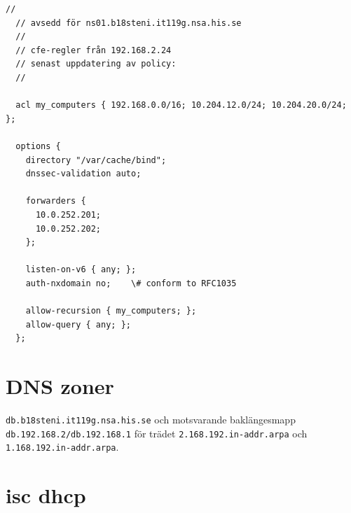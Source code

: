 \documentclass[swedish,10pt,a4paper]{article}
\begin{document}
\begin{lstlisting}[caption={/etc/bind/named.conf.options}]
  //
  // avsedd för ns01.b18steni.it119g.nsa.his.se
  //
  // cfe-regler från 192.168.2.24
  // senast uppdatering av policy:
  //

  acl my_computers { 192.168.0.0/16; 10.204.12.0/24; 10.204.20.0/24; };

  options {
    directory "/var/cache/bind";
    dnssec-validation auto;

    forwarders {
      10.0.252.201;
      10.0.252.202;
    };

    listen-on-v6 { any; };
    auth-nxdomain no;    \# conform to RFC1035

    allow-recursion { my_computers; };
    allow-query { any; };
  };
\end{lstlisting}

\section{DNS zoner}\label{sec:appendix_dns_zones}

\texttt{db.b18steni.it119g.nsa.his.se} och motsvarande baklängesmapp\@
\texttt{ db.192.168.2/db.192.168.1} för trädet \texttt{2.168.192.in-addr.arpa}
och \texttt{1.168.192.in-addr.arpa}.

\section{isc dhcp}\label{sec:appendix_isc_dhcpd_config}
\end{document}
